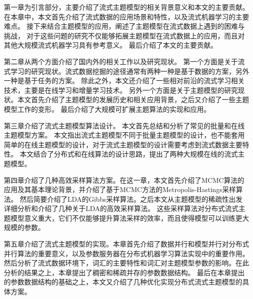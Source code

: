 第一章为引言部分，主要介绍了流式主题模型的相关背景意义和本文的主要贡献。
在本章中，本文首先介绍了流式数据的应用场景和特性，以及流式机器学习的主要难点。
接下来结合主题模型的应用，阐述了主题模型在流式数据上遇到的困难与挑战，
对于这些问题的研究不仅能够拓展主题模型在流式数据上的应用，而且对其他大规模流式机器学习具有参考意义。
最后介绍了本文的主要贡献。

第二章从两个方面介绍了国内外的相关工作以及研究现状。
第一个方面是关于流式学习的研究现状。流式数据挖掘的途径通常有两种一种是基于数据的方案，另外一种是基于任务的方案。
除此之外，本文还介绍了一些相对前沿的流式学习相关技术，主要是在线学习和增量学习技术。
另外一个方面是关于主题模型的研究现状。本文首先介绍了主题模型的发展历史和相关应用背景，之后又介绍了一些主题模型工作的变形。
最后介绍了大规模可扩展主题算法的实现和应用。

第三章介绍了流式主题模型算法设计。
本文首先总结和分析了常见的批量和在线主题模型方案。
本文指出流式主题模型不同于批量主题模型的设计，也不能套用简单的在线主题模型的设计，对于流式主题模型的设计需要考虑到流式数据主要特性。
本文结合了分布式和在线算法的设计思路，提出了两种大规模在线的流式主题模型。

第四章介绍了几种高效采样算法方案。在这一章，本文首先介绍了MCMC算法的应用及其基本理论背景，并介绍了基于MCMC方法的Metropolis-Hastings采样算法。
然后简要介绍了LDA的Gibbs采样算法。之后本文从主题模型的稀疏性出发详细分析和介绍了几种关于LDA的高效采样算法。
这些采样算法对分布式流式主题模型意义重大，它们不仅能够提升算法采样的效率，而且使得模型可以训练更大规模的参数。

第五章介绍了流式主题模型的实现。本章首先介绍了数据并行和模型并行对分布式并行算法的重要意义，以及参数服务器在分布式机器学习算法实现中的重要作用。
然后分析了流式数据环境下，词汇的主要特性和词汇对主题模型参数的影响。在此分析的结果之上，本章提出了稠密和稀疏并存的参数数据结构。
最后在本章提出的参数数据结构的基础之上，本文又介绍了几种优化实现分布式流式主题模型的具体方案。
